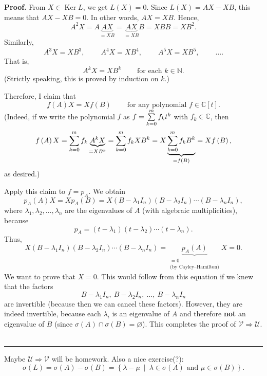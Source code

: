 \documentclass[numbers=enddot,12pt,final,onecolumn,notitlepage]{scrartcl}%
\newcounter{exer}
\numberwithin{exer}{subsection}
\theoremstyle{definition}
\newenvironment{proof}[1][Proof]{\noindent\textbf{#1.} }{\ \rule{0.5em}{0.5em}}
\let\sumnonlimits\sum
\renewcommand{\sum}{\sumnonlimits\limits}
\begin{document}
\begin{proof}
From $X\in\operatorname*{Ker}L$, we get $L\left(  X\right)  =0$. Since
$L\left(  X\right)  =AX-XB$, this means that $AX-XB=0$. In other words,
$AX=XB$. Hence,%
\[
A^{2}X=A\underbrace{AX}_{=XB}=\underbrace{AX}_{=XB}B=XBB=XB^{2}.
\]
Similarly,%
\[
A^{3}X=XB^{3},\ \ \ \ \ \ \ \ \ \ A^{4}X=XB^{4},\ \ \ \ \ \ \ \ \ \ A^{5}%
X=XB^{5},\ \ \ \ \ \ \ \ \ \ \ldots.
\]
That is,%
\[
A^{k}X=XB^{k}\ \ \ \ \ \ \ \ \ \ \text{for each }k\in\mathbb{N}.
\]
(Strictly speaking, this is proved by induction on $k$.)

Therefore, I claim that%
\[
f\left(  A\right)  X=Xf\left(  B\right)  \ \ \ \ \ \ \ \ \ \ \text{for any
polynomial }f\in\mathbb{C}\left[  t\right]  .
\]
(Indeed, if we write the polynomial $f$ as $f=\sum\limits_{k=0}^{m}f_{k}t^{k}$
with $f_{k}\in\mathbb{C}$, then%
\[
f\left(  A\right)  X=\sum\limits_{k=0}^{m}f_{k}\underbrace{A^{k}X}_{=XB^{k}%
}=\sum\limits_{k=0}^{m}f_{k}XB^{k}=X\underbrace{\sum\limits_{k=0}^{m}%
f_{k}B^{k}}_{=f\left(  B\right)  }=Xf\left(  B\right)  ,
\]
as desired.)

Apply this claim to $f=p_{A}$. We obtain%
\[
p_{A}\left(  A\right)  X=Xp_{A}\left(  B\right)  =X\left(  B-\lambda_{1}%
I_{n}\right)  \left(  B-\lambda_{2}I_{n}\right)  \cdots\left(  B-\lambda
_{n}I_{n}\right)  ,
\]
where $\lambda_{1},\lambda_{2},\ldots,\lambda_{n}$ are the eigenvalues of $A$
(with algebraic multiplicities), because%
\[
p_{A}=\left(  t-\lambda_{1}\right)  \left(  t-\lambda_{2}\right)
\cdots\left(  t-\lambda_{n}\right)  .
\]
Thus,%
\[
X\left(  B-\lambda_{1}I_{n}\right)  \left(  B-\lambda_{2}I_{n}\right)
\cdots\left(  B-\lambda_{n}I_{n}\right)  =\underbrace{p_{A}\left(  A\right)
}_{\substack{=0\\\text{(by Cayley--Hamilton)}}}X=0.
\]
We want to prove that $X=0$. This would follow from this equation if we knew
that the factors
\[
B-\lambda_{1}I_{n},\ B-\lambda_{2}I_{n},\ \ldots,\ B-\lambda_{n}I_{n}%
\]
are invertible (because then we can cancel these factors). However, they are
indeed invertible, because each $\lambda_{i}$ is an eigenvalue of $A$ and
therefore \textbf{not} an eigenvalue of $B$ (since $\sigma\left(  A\right)
\cap\sigma\left(  B\right)  =\varnothing$). This completes the proof of
$\mathcal{V}\Longrightarrow\mathcal{U}$.
\end{proof}

Maybe $\mathcal{U}\Longrightarrow\mathcal{V}$ will be homework. Also a nice
exercise(?):%
\[
\sigma\left(  L\right)  =\sigma\left(  A\right)  -\sigma\left(  B\right)
=\left\{  \lambda-\mu\ \mid\ \lambda\in\sigma\left(  A\right)  \text{ and }%
\mu\in\sigma\left(  B\right)  \right\}  .
\]
\end{document}
